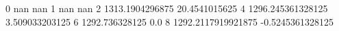 0 nan nan
1 nan nan
2 1313.1904296875 20.4541015625
4 1296.245361328125 3.509033203125
6 1292.736328125 0.0
8 1292.2117919921875 -0.5245361328125

